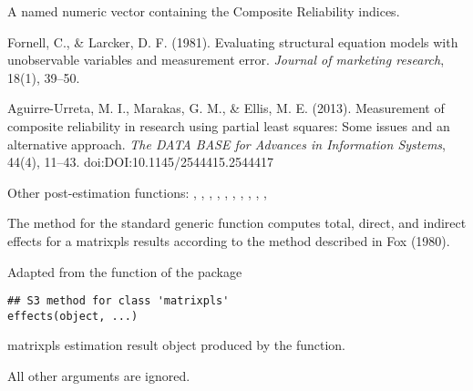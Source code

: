 \documentclass[a4paper]{book}
\begin{document}
%
\begin{Value}
A named numeric vector containing the Composite Reliability indices.
\end{Value}
%
\begin{References}\relax
Fornell, C., \& Larcker, D. F. (1981). Evaluating structural equation models with unobservable variables and measurement error. \emph{Journal of marketing research}, 18(1), 39–50.

Aguirre-Urreta, M. I., Marakas, G. M., \& Ellis, M. E. (2013). Measurement of 
composite reliability in research using partial least squares: Some issues and
an alternative approach. 
\emph{The DATA BASE for Advances in Information Systems}, 44(4), 11–43. 
doi:\nobreakspace{}DOI:10.1145/2544415.2544417
\end{References}
%
\begin{SeeAlso}\relax
Other post-estimation functions: 
,
,
,
,
,
,
,
,
,
,
\end{SeeAlso}
%
\begin{Description}\relax
The  method for the standard generic function  computes total, direct, 
and indirect effects for a matrixpls results according to the method described in Fox (1980).

Adapted from the  function of the  package
\end{Description}
%
\begin{Usage}
\begin{verbatim}
## S3 method for class 'matrixpls'
effects(object, ...)
\end{verbatim}
\end{Usage}
%
\begin{Arguments}
\begin{ldescription}
\item[\code{object}] matrixpls estimation result object produced by the  function.

\item[\code{...}] All other arguments are ignored.
\end{ldescription}
\end{Arguments}
\end{document}
